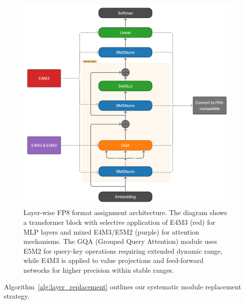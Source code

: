 \documentclass[conference]{IEEEtran}
\begin{document}
\begin{figure}[htbp]
    \centering
    \includegraphics[width=1\columnwidth]{fp8_convert.png}
    \caption{Layer-wise FP8 format assignment architecture. The diagram shows a transformer block with selective application of E4M3 (red) for MLP layers and mixed E4M3/E5M2 (purple) for attention mechanisms. The GQA (Grouped Query Attention) module uses E5M2 for query-key operations requiring extended dynamic range, while E4M3 is applied to value projections and feed-forward networks for higher precision within stable ranges.}
    \label{fig:fp8_architecture}
\end{figure}

\noindent Algorithm~\ref{alg:layer_replacement} outlines our systematic module replacement strategy.
\end{document}
